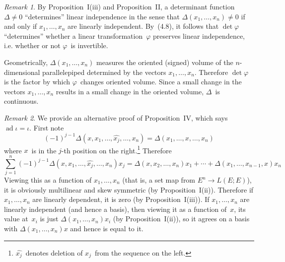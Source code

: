 \documentclass[letterpaper,12pt]{article}
\DeclareMathOperator{\ad}{ad}
\newcommand{\delete}{\widehat}
\theoremstyle{definition}
\theoremstyle{remark}
\newtheorem*{rmk}{Remark}
\begin{document}
\begin{rmk}
By Proposition~I(iii) and Proposition~II, a determinant function \(\Delta\ne 0\) ``determines'' linear independence in the sense that \(\Delta(x_1,\ldots,x_n)\ne0\) if and only if \(x_1,\ldots,x_n\) are linearly independent. By~(4.8), it follows that \(\det\varphi\) ``determines'' whether a linear transformation~\(\varphi\) preserves linear independence, i.e. whether or not \(\varphi\)~is invertible.

Geometrically, \(\Delta(x_1,\ldots,x_n)\) measures the oriented (signed) volume of the \(n\)-dimensional parallelepiped determined by the vectors \(x_1,\ldots,x_n\). Therefore \(\det\varphi\) is the factor by which \(\varphi\)~changes oriented volume. Since a small change in the vectors \(x_1,\ldots,x_n\) results in a small change in the oriented volume, \(\Delta\)~is continuous.
\end{rmk}

\begin{rmk}
We provide an alternative proof of Proposition~IV, which says \(\ad\iota=\iota\). First note
\[(-1)^{j-1}\Delta(x,x_1,\ldots,\delete{x_j},\ldots,x_n)=\Delta(x_1,\ldots,x,\ldots,x_n)\]
where \(x\)~is in the \(j\)-th position on the right.\footnote{\(\delete{x_j}\)~denotes deletion of \(x_j\)~from the sequence on the left.} Therefore
\[\sum_{j=1}^n(-1)^{j-1}\Delta(x,x_1,\ldots,\delete{x_j},\ldots,x_n)x_j=\Delta(x,x_2,\ldots,x_n)x_1+\cdots+\Delta(x_1,\ldots,x_{n-1},x)x_n\]
Viewing this as a function of \(x_1,\ldots,x_n\) (that is, a set map from \(E^n\to L(E;E)\)), it is obviously multilinear and skew symmetric (by Proposition~I(ii)). Therefore if \(x_1,\ldots,x_n\) are linearly dependent, it is zero (by Proposition~I(iii)). If \(x_1,\ldots,x_n\) are linearly independent (and hence a basis), then viewing it as a function of~\(x\), its value at~\(x_i\) is just \(\Delta(x_1,\ldots,x_n)x_i\) (by Proposition~I(ii)), so it agrees on a basis with \(\Delta(x_1,\ldots,x_n)x\) and hence is equal to it.
\end{rmk}
\end{document}
